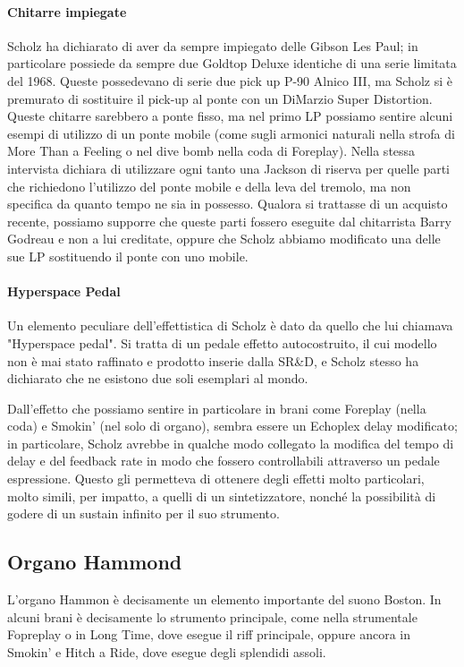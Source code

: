 \documentclass[class=book, crop=false, oneside, 12pt]{standalone}
\begin{document}
\paragraph{Chitarre impiegate}
Scholz ha dichiarato di aver da sempre impiegato delle Gibson Les Paul; in particolare possiede da sempre due Goldtop Deluxe identiche di una serie limitata del 1968\cite{site:musicradar_gear}. Queste possedevano di serie due pick up P-90 Alnico III, ma Scholz si è premurato di sostituire il pick-up al ponte con un DiMarzio Super Distortion. Queste chitarre sarebbero a ponte fisso, ma nel primo LP possiamo sentire alcuni esempi di utilizzo di un ponte mobile (come sugli armonici naturali nella strofa di More Than a Feeling o nel dive bomb nella coda di Foreplay). Nella stessa intervista dichiara di utilizzare ogni tanto una Jackson di riserva per quelle parti che richiedono l'utilizzo del ponte mobile e della leva del tremolo, ma non specifica da quanto tempo ne sia in possesso\cite{site:musicradar_gear}. Qualora si trattasse di un acquisto recente, possiamo supporre che queste parti fossero eseguite dal chitarrista Barry Godreau e non a lui creditate, oppure che Scholz abbiamo modificato una delle sue LP sostituendo il ponte con uno mobile.

\paragraph{Hyperspace Pedal}
Un elemento peculiare dell'effettistica di Scholz è dato da quello che lui chiamava "Hyperspace pedal". Si tratta di un pedale effetto autocostruito, il cui modello non è mai stato raffinato e prodotto inserie dalla SR\&D, e Scholz stesso ha dichiarato che ne esistono due soli esemplari al mondo\cite{yt:scholz_sound}.

Dall'effetto che possiamo sentire in particolare in brani come Foreplay (nella coda) e Smokin' (nel solo di organo), sembra essere un Echoplex delay modificato; in particolare, Scholz avrebbe in qualche modo collegato la modifica del tempo di delay e del feedback rate in modo che fossero controllabili attraverso un pedale espressione. Questo gli permetteva di ottenere degli effetti molto particolari, molto simili, per impatto, a quelli di un sintetizzatore, nonché la possibilità di godere di un sustain infinito per il suo strumento\cite{yt:scholz_sound}.

\subsection{Organo Hammond}
L'organo Hammon è decisamente un elemento importante del suono Boston. In alcuni brani è decisamente lo strumento principale, come nella strumentale Fopreplay o in Long Time, dove esegue il riff principale, oppure ancora in Smokin' e Hitch a Ride, dove esegue degli splendidi assoli.
\end{document}
